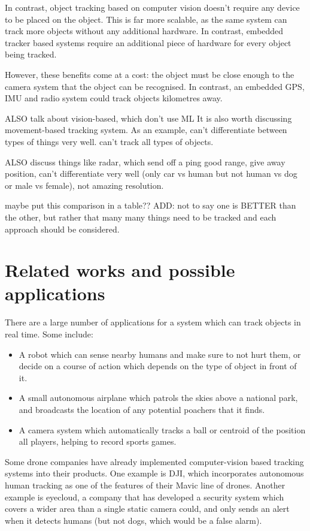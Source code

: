 In contrast, object tracking based on computer vision doesn't require any device to be placed on the object. This is far more scalable, as the same system can track more objects without any additional hardware. In contrast, embedded tracker based systems require an additional piece of hardware for every object being tracked.

However, these benefits come at a cost: the object must be close enough to the camera system that the object can be recognised. In contrast, an embedded GPS, IMU and radio system could track objects kilometres away.

{\Large \color{red} ALSO talk about vision-based, which don't use ML}
It is also worth discussing movement-based tracking system. As an example, 
can't differentiate between types of things very well. can't track all types of objects.

{\Large \color{red} ALSO discuss things like radar, which send off a ping}
good range, give away position, can't differentiate very well (only car vs human but not human vs dog or male vs female), not amazing resolution.

{\Large \color{red} maybe put this comparison in a table??}
ADD: not to say one is BETTER than the other, but rather that many many things need to be tracked and each approach should be considered.





\section{Related works and possible applications}
There are a large number of applications for a system which can track objects in real time. Some include:

\begin{itemize}
\item A robot which can sense nearby humans and make sure to not hurt them, or decide on a course of action which depends on the type of object in front of it.
\item A small autonomous airplane which patrols the skies above a national park, and broadcasts the location of any potential poachers that it finds.
\item A camera system which automatically tracks a ball or centroid of the position all players, helping to record sports games.
\end{itemize}

Some drone companies have already implemented computer-vision based tracking systems into their products. One example is DJI, which incorporates autonomous human tracking as one of the features of their Mavic line of drones. Another example is eyecloud, a company that has developed a security system which covers a wider area than a single static camera could, and only sends an alert when it detects humans (but not dogs, which would be a false alarm).
